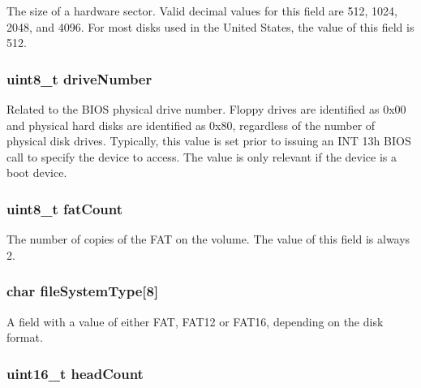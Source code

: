 The size of a hardware sector. Valid decimal values for this field are 512, 1024, 2048, and 4096. For most disks used in the United States, the value of this field is 512. \hypertarget{structfat__boot_aa7c65fdb4f759fca094105d1c870bcb2}{
\subsubsection[{drive\-Number}]{\setlength{\rightskip}{0pt plus 5cm}uint8\-\_\-t drive\-Number}}\label{structfat__boot_aa7c65fdb4f759fca094105d1c870bcb2}
Related to the B\-I\-O\-S physical drive number. Floppy drives are identified as 0x00 and physical hard disks are identified as 0x80, regardless of the number of physical disk drives. Typically, this value is set prior to issuing an I\-N\-T 13h B\-I\-O\-S call to specify the device to access. The value is only relevant if the device is a boot device. \hypertarget{structfat__boot_a624e9eb125b4fc8aeaebcccf79e17aa8}{
\subsubsection[{fat\-Count}]{\setlength{\rightskip}{0pt plus 5cm}uint8\-\_\-t fat\-Count}}\label{structfat__boot_a624e9eb125b4fc8aeaebcccf79e17aa8}
The number of copies of the F\-A\-T on the volume. The value of this field is always 2. \hypertarget{structfat__boot_adf80bb044ef7c8ac6d371268aa338e23}{
\subsubsection[{file\-System\-Type}]{\setlength{\rightskip}{0pt plus 5cm}char file\-System\-Type\mbox{[}8\mbox{]}}}\label{structfat__boot_adf80bb044ef7c8ac6d371268aa338e23}
A field with a value of either F\-A\-T, F\-A\-T12 or F\-A\-T16, depending on the disk format. \hypertarget{structfat__boot_a57cb7e16b9969fa87c9f1ca43a87d217}{
\subsubsection[{head\-Count}]{\setlength{\rightskip}{0pt plus 5cm}uint16\-\_\-t head\-Count}}\label{structfat__boot_a57cb7e16b9969fa87c9f1ca43a87d217}
